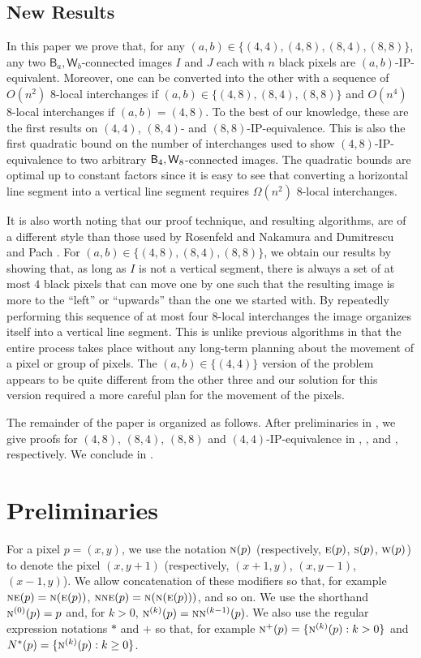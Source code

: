 \documentclass[lotsofwhite,charterfonts]{patmorin}
\newcommand{\foureight}{\ensuremath{\protect\textup{\textsf{B}}_{4},\protect\textup{\textsf{W}}_{8}}}
\newcommand{\N}{\textsc{n}}
\newcommand{\NE}{\textsc{ne}}
\newcommand{\E}{\textsc{e}}
\renewcommand{\S}{\textsc{s}}
\newcommand{\W}{\textsc{w}}
\begin{document}
\subsection{New Results}

In this paper we prove that, for any $(a,b)\in\{(4,4),(4,8),(8,4),(8,8)\}$,
any two $\textsf{B}_a,\textsf{W}_b$-connected images $I$ and $J$ each with $n$ black pixels are $(a,b)$-IP-equivalent. Moreover, one can be converted into the other with a sequence of $O(n^2)$ 8-local interchanges if $(a,b)\in\{(4,8),(8,4),(8,8)\}$ and $O(n^4)$ 8-local interchanges if $(a,b)=(4,8)$. To the best of
our knowledge, these are the first results on $(4,4)$, $(8,4)$- and
$(8,8)$-IP-equivalence. This is also the first quadratic bound on the
number of interchanges used to show $(4,8)$-IP-equivalence to two
arbitrary \foureight-connected images.  The quadratic bounds are optimal up to
constant factors since it is easy to see that converting a horizontal
line segment into a vertical line segment requires $\Omega(n^2)$
8-local interchanges.

It is also worth noting that our proof technique, and resulting
algorithms, are of a different style than those used by Rosenfeld and
Nakamura \cite{rn02} and Dumitrescu and Pach \cite{dp04}. For $(a,b)\in\{(4,8),(8,4),(8,8)\}$, we obtain
our results by showing that, as long as $I$ is not a vertical segment, there is always a set of at most $4$ black pixels that can move one by one such that the resulting image is more to the ``left'' or ``upwards'' than the one we started with. By repeatedly performing this sequence of at most four $8$-local interchanges the image organizes itself into a vertical line segment.  This is unlike
previous algorithms \cite{dp04,rn02} in that the entire process takes
place without any long-term planning about the movement of a pixel or
group of pixels. The $(a,b)\in\{(4,4)\}$ version of the problem appears to be quite different from the other three and our solution for this version required a more careful plan for the movement of the pixels. 

The remainder of the paper is organized as follows. After preliminaries in , we give proofs for $(4,8)$, $(8,4)$, $(8,8)$ and $(4,4)$-IP-equivalence in , ,  and , respectively. We conclude in .



\section{Preliminaries}
For a pixel $p=(x,y)$, we use the notation $\N(p)$ (respectively,
$\E(p)$, $\S(p)$, $\W(p)$) to denote the pixel $(x,y+1)$
(respectively, $(x+1,y)$, $(x,y-1)$, $(x-1,y)$).  We allow
concatenation of these modifiers so that, for example
$\NE(p)=\N(\E(p))$, $\N\NE(p)=\N(\N(\E(p)))$, and so on.  We use the
shorthand $\N^{(0)}(p)=p$ and, for $k>0$,
$\N^{(k)}(p)=\N\N^{(k-1)}(p)$.  We also use the regular expression
notations $*$ and $+$ so that, for example $\N^+(p)=\{\N^{(k)}(p):
k>0\}$ and $N^*(p)=\{\N^{(k)}(p): k\ge 0\}$.
 
\end{document}
